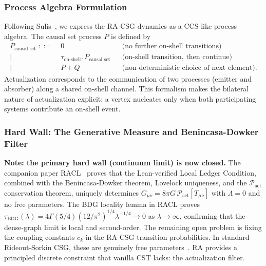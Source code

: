 \documentclass[11pt,a4paper]{article}
\theoremstyle{plain}
\theoremstyle{definition}
\theoremstyle{remark}
\begin{document}
\subsubsection{Process Algebra Formulation}

Following Sulis~\citep{Sulis2020}, we express the RA-CSG dynamics as a
CCS-like process algebra. The causal set process $P$ is defined by
\begin{align*}
  P_{\text{causal set}} \;::=\;&
    0 & &\text{(no further on-shell transitions)}\\
    \mid\;& \tau_{\text{on-shell}}.\,P_{\text{causal set}}
            & &\text{(on-shell transition, then continue)}\\
    \mid\;& P + Q
            & &\text{(non-deterministic choice of next element).}
\end{align*}
Actualization corresponds to the communication of two processes (emitter and
absorber) along a shared on-shell channel. This formalism makes the bilateral
nature of actualization explicit: a vertex nucleates only when both participating
systems contribute an on-shell event.

\subsubsection{Hard Wall: The Generative Measure and Benincasa-Dowker Filter}

\textbf{Note: the primary hard wall (continuum limit) is now closed.}
The companion paper RACL~\citep{Sandeman2026RACL} proves that the
Lean-verified Local Ledger Condition, combined with the Benincasa-Dowker
theorem, Lovelock uniqueness, and the $\mathcal{P}_{\mathrm{act}}$
conservation theorem, uniquely determines
$G_{\mu\nu} = 8\pi G\,\mathcal{P}_{\mathrm{act}}[T_{\mu\nu}]$ with
$\Lambda = 0$ and no free parameters. The BDG locality lemma in RACL
proves $\tau_{\mathrm{BDG}}(\lambda) = 4\Gamma(5/4)(12/\pi^2)^{1/4}
\lambda^{-1/4} \to 0$ as $\lambda \to \infty$, confirming that
the dense-graph limit is local and second-order.
The remaining open problem is fixing the coupling constants $c_k$ in the RA-CSG
transition probabilities. In standard Rideout-Sorkin CSG, these are genuinely
free parameters~\citep{Sorkin2003}. RA provides a principled discrete constraint
that vanilla CST lacks: the actualization filter.
\end{document}
